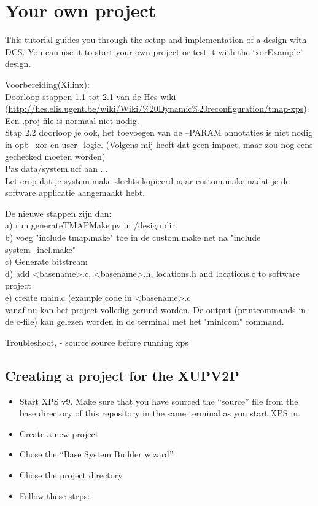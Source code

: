 \documentclass[a4paper,oneside]{memoir}
\begin{document}
\section{Your own project}
This tutorial guides you through the setup and implementation of a design with DCS. You can use it to start your own project or test it with the `xorExample' design.


Voorbereiding(Xilinx):\\
Doorloop stappen 1.1 tot 2.1 van de Hes-wiki (\url{http://hes.elis.ugent.be/wiki/Wiki/%20Dynamic%20reconfiguration/tmap-xps}). Een .proj file is normaal niet nodig.\\
Stap 2.2 doorloop je ook, het toevoegen van de --PARAM annotaties is niet nodig in opb\_xor en user\_logic. (Volgens mij heeft dat geen impact, maar zou nog eens gechecked moeten worden)\\
Pas data/system.ucf aan ...\\
Let erop dat je system.make slechts kopieerd naar custom.make nadat je de software applicatie aangemaakt hebt.

De nieuwe stappen zijn dan:\\
a) run generateTMAPMake.py in /design dir.\\
b) voeg "include tmap.make" toe in de custom.make net na "include system\_incl.make"\\
c) Generate bitstream\\
d) add <basename>.c, <basename>.h, locations.h and locations.c to  software project\\
e) create main.c (example code in <basename>.c\\
vanaf nu kan het project volledig gerund worden. De output (printcommands in de c-file) kan gelezen worden in de terminal met het "minicom" command.


Troubleshoot, - source source before running xps

\subsection{Creating a project for the XUPV2P}

\begin{itemize}
\item Start XPS v9. Make sure that you have sourced the ``source'' file from the base directory of this repository in the same terminal as you start XPS in.
\item    Create a new project
\item    Chose the ``Base System Builder wizard''
\item    Chose the project directory
\item    Follow these steps:
\end{itemize}
\end{document}
